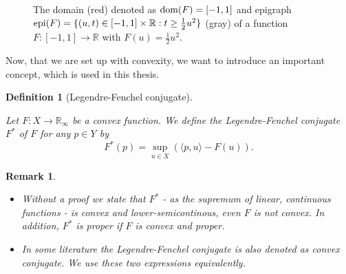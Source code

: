 \documentclass{scrreprt}
\newtheorem{definition}[theorem]{Definition}
\newtheorem{remark}[theorem]{Remark}
\begin{document}
        \begin{figure}[!ht]
            \centering
            \label{fig:domain_epigraph}
            \caption[Domain and Epigraph.]{The domain (red) denoted as $\textnormal{dom}(F) = [-1, 1]$ and epigraph \\$\textnormal{epi}(F) = \{(u, t) \in [-1, 1] \times \mathbb{R} : t \ge \frac{1}{2}u^{2}\}$ (gray) of a function $F: [-1, 1] \longrightarrow \mathbb{R}$ with $F(u) = \frac{1}{2}u^{2}$.}
        \end{figure}

        Now, that we are set up with convexity, we want to introduce an important concept, which is used in this thesis.

        \begin{definition}[Legendre-Fenchel conjugate] %
        \label{def:legendre_fenchel_conjugate}

            Let $F: X \longrightarrow \mathbb{R}_{\infty}$ be a convex function. We define the Legendre-Fenchel conjugate $F^{\ast}$ of $F$ for any $p \in Y$ by
                \begin{equation}
                    F^{\ast}(p) = \sup_{u \in X} \left( \langle p, u \rangle - F(u) \right).
                    \label{eq:legendre_fenchel_conjugate}
                \end{equation}

        \end{definition}

        \begin{remark} %
            \begin{itemize}
                \item Without a proof we state that $F^{\ast}$ - as the supremum of linear, continuous functions - is convex and lower-semicontinous, even $F$ is not convex. In addition, $F^{\ast}$ is proper if $F$ is convex and proper.
                \item In some literature the Legendre-Fenchel conjugate is also denoted as convex conjugate. We use these two expressions equivalently.
            \end{itemize}
        \end{remark}
\end{document}
